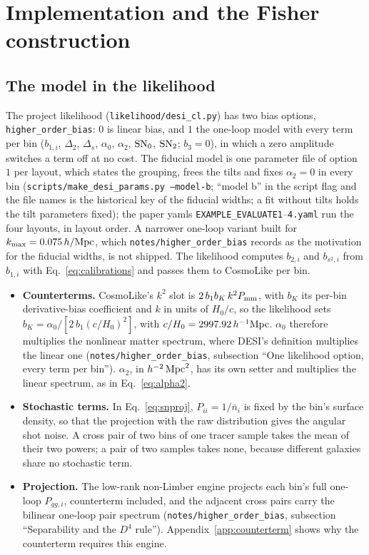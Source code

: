 \documentclass[11pt]{article}
\newcommand{\kmax}{k_{\rm max}}
\newcommand{\hMpc}{\,h/{\rm Mpc}}
\newcommand{\SNz}{{\rm SN}_0}
\newcommand{\SNt}{{\rm SN}_2}
\begin{document}
\section{Implementation and the Fisher construction}
\label{app:impl}

\subsection{The model in the likelihood}
\label{sec:likelihood}

The project likelihood (\texttt{likelihood/desi\_cl.py}) has two bias
options, \texttt{higher\_order\_bias}: $0$ is linear bias, and $1$ the
one-loop model with every term per bin ($b_{1,i}$, $\Delta_2$,
$\Delta_s$, $\alpha_0$, $\alpha_2$, $\SNz$, $\SNt$; $b_3 = 0$), in
which a zero amplitude switches a term off at no cost.  The fiducial
model is one
parameter file of option $1$ per layout, which states the
grouping, frees the tilts and fixes $\alpha_2 = 0$ in every bin
(\texttt{scripts/make\_desi\_params.py --model-b};
``model b'' in the script flag and the file names is the historical
key of the fiducial widths; a fit without tilts holds the tilt
parameters fixed); the paper
yamls \texttt{EXAMPLE\_EVALUATE1}--\texttt{4.yaml} run the four
layouts, in layout order.  A narrower one-loop variant built for
$\kmax = 0.075\hMpc$, which \texttt{notes/higher\_order\_bias}
records as the motivation for the fiducial widths, is not shipped.
The likelihood computes $b_{2,i}$ and $b_{s^2,i}$ from $b_{1,i}$ with
Eq.~\eqref{eq:calibrations} and passes them to CosmoLike per bin.
\begin{itemize}
  \item \textbf{Counterterms.}  CosmoLike's $k^2$ slot is
    $2\,b_1 b_K\,k^2 P_{\rm mm}$, with $b_K$ its per-bin
    derivative-bias coefficient and $k$ in units of $H_0/c$, so the
    likelihood sets $b_K = \alpha_0/[2\,b_1 (c/H_0)^2]$, with
    $c/H_0 = 2997.92\,h^{-1}{\rm Mpc}$.  $\alpha_0$ therefore
    multiplies the nonlinear matter spectrum, where DESI's definition
    multiplies the linear one (\texttt{notes/higher\_order\_bias},
    subsection ``One likelihood option, every term per bin'').
    $\alpha_2$, in $h^{-2}\,{\rm Mpc}^2$, has its own setter and
    multiplies the linear spectrum, as in Eq.~\eqref{eq:alpha2}.
  \item \textbf{Stochastic terms.}  In Eq.~\eqref{eq:snproj},
    $P_{ii} = 1/\bar{n}_i$ is fixed by the bin's surface density, so
    that the projection with the raw distribution gives the angular
    shot noise.  A cross pair of two bins of one tracer sample takes
    the mean of their two powers; a pair of two samples takes none,
    because different galaxies share no stochastic term.
  \item \textbf{Projection.}  The low-rank non-Limber engine projects
    each bin's full one-loop $P_{gg,i}$, counterterm included, and the
    adjacent cross pairs carry the bilinear one-loop pair spectrum
    (\texttt{notes/higher\_order\_bias}, subsection ``Separability and
    the $D^4$ rule'').  Appendix~\ref{app:counterterm} shows why the
    counterterm requires this engine.
\end{itemize}
\end{document}
